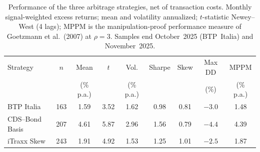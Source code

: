 \begin{table}[t]
\centering
\caption{Performance of the three arbitrage strategies, net of transaction
costs. Monthly signal-weighted excess returns; mean and volatility annualized;
$t$-statistic Newey--West (4 lags); MPPM is the manipulation-proof performance
measure of Goetzmann et al.\ (2007) at $\rho=3$. Samples end October~2025
(BTP~Italia) and November~2025.
\label{tab:performance}\label{tab:summary_stats_monthly}}
\small
\begin{tabular}{lcccccccc}
\toprule
Strategy & $n$ & Mean & $t$ & Vol. & Sharpe & Skew & Max DD & MPPM \\
 & & (\% p.a.) & & (\% p.a.) & & & (\%) & (\% p.a.) \\
\midrule
BTP Italia      & 163 & 1.59 & 3.52 & 1.62 & 0.98 & 0.81 & $-3.0$ & 1.48 \\
CDS--Bond Basis & 207 & 4.61 & 5.87 & 2.96 & 1.56 & 0.79 & $-4.4$ & 4.39 \\
iTraxx Skew     & 243 & 1.91 & 4.92 & 1.53 & 1.25 & 1.01 & $-2.5$ & 1.87 \\
\bottomrule
\end{tabular}
\end{table}
